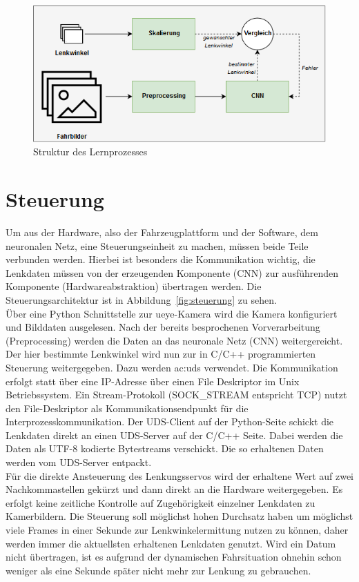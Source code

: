 

\begin{figure}[h]
	\centering
	\includegraphics[width=\linewidth]{figures/Lernarchitektur.png}
	\caption{Struktur des Lernprozesses}
	\label{img:lernarchitektur}
\end{figure}


\section{Steuerung}

Um aus der Hardware, also der Fahrzeugplattform und der Software, dem neuronalen Netz, eine Steuerungseinheit zu machen, müssen beide Teile verbunden werden. Hierbei ist besonders die Kommunikation wichtig, die Lenkdaten müssen von der erzeugenden Komponente (CNN) zur ausführenden Komponente (Hardwareabstraktion) übertragen werden. Die Steuerungsarchitektur ist in Abbildung~\ref{fig:steuerung} zu sehen.\\
Über eine Python Schnittstelle zur ueye-Kamera wird die Kamera konfiguriert und Bilddaten ausgelesen. Nach der bereits besprochenen Vorverarbeitung (Preprocessing) werden die Daten an das neuronale Netz (CNN) weitergereicht.\\ 
Der hier bestimmte Lenkwinkel wird nun zur in C/C++ programmierten Steuerung weitergegeben. Dazu werden \gls{ac:uds} verwendet. Die Kommunikation erfolgt statt über eine IP-Adresse über einen File Deskriptor im Unix Betriebssystem. Ein Stream-Protokoll (SOCK_STREAM entspricht TCP) nutzt den File-Deskriptor als Kommunikationsendpunkt für die Interprozesskommunikation. Der UDS-Client auf der Python-Seite schickt die Lenkdaten direkt an einen UDS-Server auf der C/C++ Seite. Dabei werden die Daten als UTF-8 kodierte Bytestreams verschickt. Die so erhaltenen Daten werden vom UDS-Server entpackt.\\
Für die direkte Ansteuerung des Lenkungsservos wird der erhaltene Wert auf zwei Nachkommastellen gekürzt und dann direkt an die Hardware weitergegeben. Es erfolgt keine zeitliche Kontrolle auf Zugehörigkeit einzelner Lenkdaten zu Kamerbildern. Die Steuerung soll möglichst hohen Durchsatz haben um möglichst viele Frames in einer Sekunde zur Lenkwinkelermittung nutzen zu können, daher werden immer die aktuellsten erhaltenen Lenkdaten genutzt. Wird ein Datum nicht übertragen, ist es aufgrund der dynamischen Fahrsituation ohnehin schon weniger als eine Sekunde später nicht mehr zur Lenkung zu gebrauchen.


